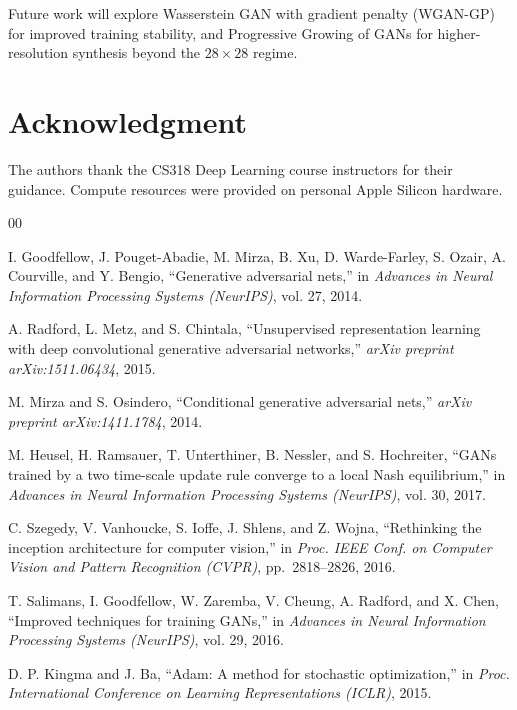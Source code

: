 \documentclass[conference]{IEEEtran}
\begin{document}
Future work will explore Wasserstein GAN with gradient penalty (WGAN-GP) \cite{gulrajani2017wgan} for improved training stability, and Progressive Growing of GANs \cite{karras2018progressive} for higher-resolution synthesis beyond the $28\times28$ regime.

\section*{Acknowledgment}
The authors thank the CS318 Deep Learning course instructors for their guidance. Compute resources were provided on personal Apple Silicon hardware.

\begin{thebibliography}{00}

I. Goodfellow, J. Pouget-Abadie, M. Mirza, B. Xu, D. Warde-Farley, S. Ozair, A. Courville, and Y. Bengio,
``Generative adversarial nets,''
in \textit{Advances in Neural Information Processing Systems (NeurIPS)}, vol. 27, 2014.

A. Radford, L. Metz, and S. Chintala,
``Unsupervised representation learning with deep convolutional generative adversarial networks,''
\textit{arXiv preprint arXiv:1511.06434}, 2015.

M. Mirza and S. Osindero,
``Conditional generative adversarial nets,''
\textit{arXiv preprint arXiv:1411.1784}, 2014.

M. Heusel, H. Ramsauer, T. Unterthiner, B. Nessler, and S. Hochreiter,
``GANs trained by a two time-scale update rule converge to a local Nash equilibrium,''
in \textit{Advances in Neural Information Processing Systems (NeurIPS)}, vol. 30, 2017.

C. Szegedy, V. Vanhoucke, S. Ioffe, J. Shlens, and Z. Wojna,
``Rethinking the inception architecture for computer vision,''
in \textit{Proc. IEEE Conf. on Computer Vision and Pattern Recognition (CVPR)}, pp.\ 2818--2826, 2016.

T. Salimans, I. Goodfellow, W. Zaremba, V. Cheung, A. Radford, and X. Chen,
``Improved techniques for training GANs,''
in \textit{Advances in Neural Information Processing Systems (NeurIPS)}, vol. 29, 2016.

D. P. Kingma and J. Ba,
``Adam: A method for stochastic optimization,''
in \textit{Proc. International Conference on Learning Representations (ICLR)}, 2015.


\end{thebibliography}
\end{document}
